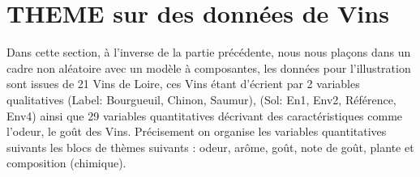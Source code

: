 \documentclass[a4paper,french,10pt]{article}
\begin{document}



\newpage

\section{THEME sur des données de Vins}

Dans cette section, à l'inverse de la partie précédente, nous nous plaçons dans un cadre non aléatoire avec un modèle à composantes, les données pour l'illustration sont issues de 21 Vins de Loire, ces Vins étant d'écrient par 2 variables qualitatives (Label: Bourgueuil, Chinon, Saumur), (Sol: En1, Env2, Référence, Env4) ainsi que 29 variables quantitatives décrivant des
caractéristiques comme l’odeur, le goût des Vins. \newline
Précisement on organise les variables quantitatives suivants les blocs de thèmes suivants : odeur, arôme, goût, note de goût, plante et composition (chimique).\newline
\end{document}

